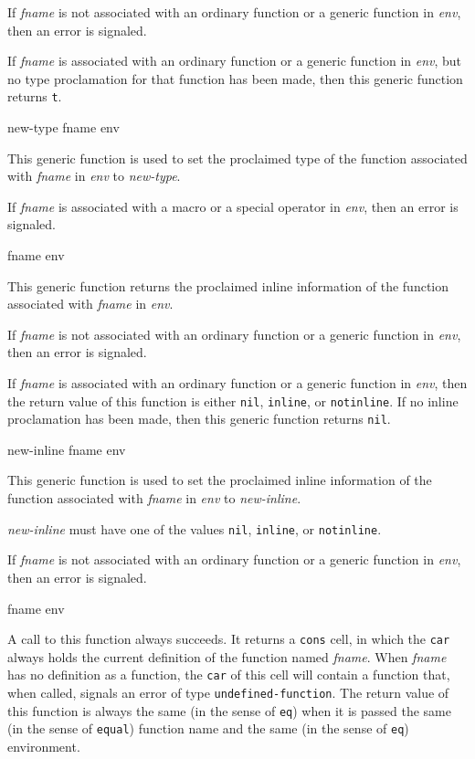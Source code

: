 If \textit{fname} is not associated with an ordinary function or a
generic function in \textit{env}, then an error is signaled.

If \textit{fname} is associated with an ordinary function or a generic
function in \textit{env}, but no type proclamation for that function
has been made, then this generic function returns \texttt{t}.

 {new-type fname env}

This generic function is used to set the proclaimed type of the
function associated with \textit{fname} in \textit{env}
to \textit{new-type}.

If \textit{fname} is associated with a macro or a special operator
in \textit{env}, then an error is signaled.

 {fname env}

This generic function returns the proclaimed inline information of
the function associated with \textit{fname} in \textit{env}.

If \textit{fname} is not associated with an ordinary function or a
generic function in \textit{env}, then an error is signaled.

If \textit{fname} is associated with an ordinary function or a
generic function in \textit{env}, then the return value of this
function is either \texttt{nil}, \texttt{inline}, or \texttt{notinline}.  If no inline
proclamation has been made, then this generic function returns
\texttt{nil}.

 {new-inline fname env}

This generic function is used to set the proclaimed inline
information of the function associated with \textit{fname} in
\textit{env} to \textit{new-inline}.

\textit{new-inline} must have one of the values \texttt{nil}, \texttt{inline}, or
\texttt{notinline}.

If \textit{fname} is not associated with an ordinary function or a
generic function in \textit{env}, then an error is signaled.

 {fname env}

A call to this function always succeeds.  It returns a \texttt{cons} cell,
in which the \texttt{car} always holds the current definition of the
function named \textit{fname}.  When \textit{fname} has no
definition as a function, the \texttt{car} of this cell will contain a
function that, when called, signals an error of type
\texttt{undefined-function}.  The return value of this function is always
the same (in the sense of \texttt{eq}) when it is passed the same (in the
sense of \texttt{equal}) function name and the same (in the sense of \texttt{eq})
environment.

